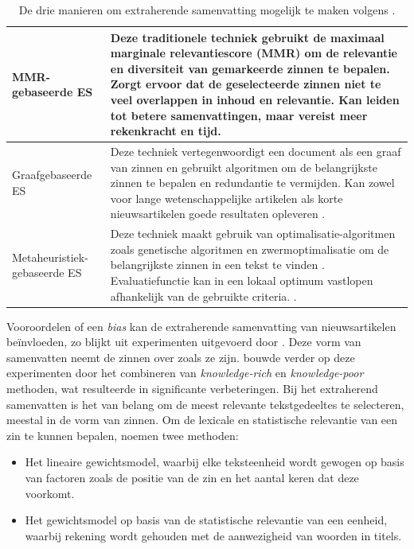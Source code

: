 \begin{center}
	\begin{table}[H]
	\begin{tabular}{ | m{4cm} | m{12cm} | } 
		\hline
		MMR-gebaseerde ES & Deze traditionele techniek gebruikt de maximaal marginale relevantiescore (MMR) om de relevantie en diversiteit van gemarkeerde zinnen te bepalen. Zorgt ervoor dat de geselecteerde zinnen niet te veel overlappen in inhoud en relevantie. Kan leiden tot betere samenvattingen, maar vereist meer rekenkracht en tijd. \\
		\hline
		Graafgebaseerde ES & Deze techniek vertegenwoordigt een document als een graaf van zinnen en gebruikt algoritmen om de belangrijkste zinnen te bepalen en redundantie te vermijden. Kan zowel voor lange wetenschappelijke artikelen als korte nieuwsartikelen goede resultaten opleveren \autocite{McDonald2007, Lin2010}. \\ 
		\hline
		Metaheuristiek-gebaseerde ES & Deze techniek maakt gebruik van optimalisatie-algoritmen zoals genetische algoritmen en zwermoptimalisatie om de belangrijkste zinnen in een tekst te vinden \autocite{Premjith2015, Verma2020}. Evaluatiefunctie kan in een lokaal optimum vastlopen afhankelijk van de gebruikte criteria. \autocite{Rani2021}. \\
		\hline
	\end{tabular}
	\caption{De drie manieren om extraherende samenvatting mogelijk te maken volgens \textcite{Verma2020}.}
	\label{table:extractive-summarization}
	\end{table}
\end{center}

\medspace

Vooroordelen of een \textit{bias} kan de extraherende samenvatting van nieuwsartikelen beïnvloeden, zo blijkt uit experimenten uitgevoerd door \textcite{McKeown1999}. Deze vorm van samenvatten neemt de zinnen over zoals ze zijn. \textcite{Hahn2000} bouwde verder op deze experimenten door het combineren van \textit{knowledge-rich} en \textit{knowledge-poor} methoden, wat resulteerde in significante verbeteringen. Bij het extraherend samenvatten is het van belang om de meest relevante tekstgedeeltes te selecteren, meestal in de vorm van zinnen. Om de lexicale en statistische relevantie van een zin te kunnen bepalen, noemen \textcite{Hahn2000} twee methoden:

\begin{itemize}
	\item Het lineaire gewichtsmodel, waarbij elke teksteenheid wordt gewogen op basis van factoren zoals de positie van de zin en het aantal keren dat deze voorkomt.
	\item Het gewichtsmodel op basis van de statistische relevantie van een eenheid, waarbij rekening wordt gehouden met de aanwezigheid van woorden in titels.
\end{itemize}

